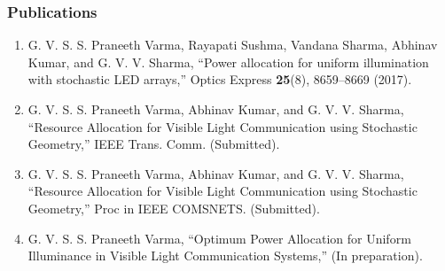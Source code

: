 \documentclass{beamer}
\theoremstyle{remark}
\begin{document}
\begin{frame}
\frametitle{Publications}
\begin{enumerate}
\item
G. V. S. S. Praneeth Varma, Rayapati Sushma, Vandana Sharma, Abhinav Kumar, and G. V. V. Sharma, ``Power allocation for uniform illumination with stochastic LED arrays,'' Optics Express 
 \textbf{25}(8), 8659--8669 (2017).

\item
G. V. S. S. Praneeth Varma, Abhinav Kumar, and G. V. V. Sharma, ``Resource Allocation for Visible Light
Communication using Stochastic Geometry,'' IEEE Trans. Comm.  (Submitted).

\item
G. V. S. S. Praneeth Varma, Abhinav Kumar, and G. V. V. Sharma, ``Resource Allocation for Visible Light
Communication using Stochastic Geometry,'' Proc in IEEE COMSNETS.  (Submitted).


\item
G. V. S. S. Praneeth Varma, ``Optimum Power Allocation for Uniform
Illuminance in Visible Light Communication Systems,'' (In preparation).

\end{enumerate}
\end{frame}
\end{document}
